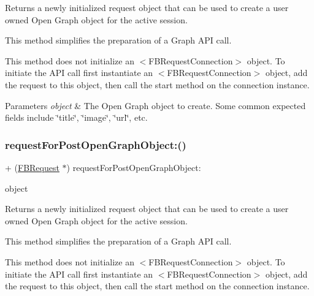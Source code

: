 Returns a newly initialized request object that can be used to create a user owned Open Graph object for the active session.

This method simplifies the preparation of a Graph A\+PI call.

This method does not initialize an $<$\+F\+B\+Request\+Connection$>$ object. To initiate the A\+PI call first instantiate an $<$\+F\+B\+Request\+Connection$>$ object, add the request to this object, then call the {\ttfamily start} method on the connection instance.


\begin{DoxyParams}{Parameters}
{\em object} & The Open Graph object to create. Some common expected fields include \char`\"{}title\char`\"{}, \char`\"{}image\char`\"{}, \char`\"{}url\char`\"{}, etc. \\
\hline
\end{DoxyParams}
\mbox{\label{interfaceFBRequest_a7eed076cb1c83e3dfe4f29ccfebe68b4}} 
\subsubsection{\texorpdfstring{request\+For\+Post\+Open\+Graph\+Object\+:()}{requestForPostOpenGraphObject:()}\hspace{0.1cm}{\footnotesize\ttfamily [3/5]}}
{\footnotesize\ttfamily + (\hyperlink{interfaceFBRequest}{F\+B\+Request} $\ast$) request\+For\+Post\+Open\+Graph\+Object\+: \begin{DoxyParamCaption}\item[{(id$<$ \hyperlink{protocolFBOpenGraphObject-p}{F\+B\+Open\+Graph\+Object} $>$)}]{object }\end{DoxyParamCaption}}

Returns a newly initialized request object that can be used to create a user owned Open Graph object for the active session.

This method simplifies the preparation of a Graph A\+PI call.

This method does not initialize an $<$\+F\+B\+Request\+Connection$>$ object. To initiate the A\+PI call first instantiate an $<$\+F\+B\+Request\+Connection$>$ object, add the request to this object, then call the {\ttfamily start} method on the connection instance.


